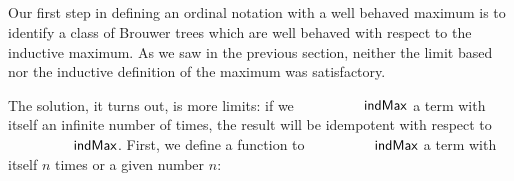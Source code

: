 \begin{code}[hide]
\AgdaSpace{}%
\AgdaSpace{}%
\AgdaSymbol{)}\AgdaSpace{}%
\<%
\\
%
\>[2]\AgdaSpace{}%
\AgdaSpace{}%
\AgdaSpace{}%
\AgdaSpace{}%
\AgdaSpace{}%
\AgdaSpace{}%
\<%
\\
%
\>[2]\AgdaSpace{}%
\AgdaSpace{}%
\AgdaSpace{}%
\AgdaSpace{}%
\AgdaSpace{}%
\AgdaSpace{}%
\AgdaSpace{}%
\<%
\\
%
\>[2]\<%
\\
\>[2][@{}l@{\AgdaIndent{0}}]%
\>[4]\AgdaSpace{}%
\AgdaSpace{}%
\<%
\end{code}

Our first step in defining an ordinal notation with a well behaved maximum
is to identify a class of Brouwer trees which are well behaved with
respect to the inductive maximum. As we saw in the previous section, neither
the limit based nor the inductive definition of the maximum was satisfactory.

The solution, it turns out, is more limits:
if we $\indMax$ a term with itself an infinite number of times,
the result will be idempotent with respect to $\indMax$.
First, we define a function to $\indMax$ a term with itself $n$
times or a given number $n$:
\begin{code}%
%
\>[4]\AgdaSpace{}%
\AgdaSymbol{:}\AgdaSpace{}%
\AgdaSpace{}%
\AgdaSpace{}%
\AgdaSpace{}%
\AgdaSpace{}%
\<%
\\
%
\>[4]\AgdaSpace{}%
\AgdaSpace{}%
\AgdaSpace{}%
\AgdaSymbol{=}\AgdaSpace{}%
\<%
\\
%
\>[4]\AgdaSpace{}%
\AgdaSpace{}%
\AgdaSymbol{(}\AgdaSpace{}%
\AgdaSymbol{)}\AgdaSpace{}%
\AgdaSymbol{=}\AgdaSpace{}%
\AgdaSpace{}%
\AgdaSymbol{(}\AgdaSpace{}%
\AgdaSpace{}%
\AgdaSymbol{)}\AgdaSpace{}%
\<%
\end{code}


